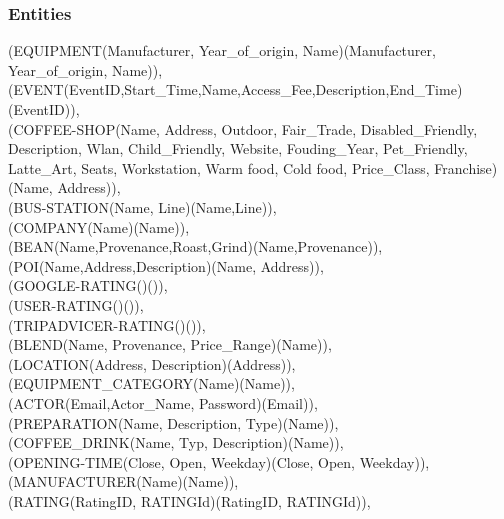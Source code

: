 { 
\subsubsection{Entities}
(EQUIPMENT(Manufacturer, Year\_of\_origin, Name)(Manufacturer, Year\_of\_origin, Name)),\\
(EVENT(EventID,Start\_Time,Name,Access\_Fee,Description,End\_Time)(EventID)),\\
(COFFEE-SHOP(Name, Address, Outdoor, Fair\_Trade, Disabled\_Friendly, Description, Wlan, Child\_Friendly, Website, Fouding\_Year, Pet\_Friendly, Latte\_Art, Seats, Workstation, Warm food, Cold food, Price\_Class, Franchise)(Name, Address)), \\
(BUS-STATION(Name, Line)(Name,Line)),\\
(COMPANY(Name)(Name)),\\
(BEAN(Name,Provenance,Roast,Grind)(Name,Provenance)),\\
(POI(Name,Address,Description)(Name, Address)), \\
(GOOGLE-RATING()()), \\
(USER-RATING()()), \\
(TRIPADVICER-RATING()()), \\
(BLEND(Name, Provenance, Price\_Range)(Name)), \\
(LOCATION(Address, Description)(Address)), \\
(EQUIPMENT\_CATEGORY(Name)(Name)), \\
(ACTOR(Email,Actor\_Name, Password)(Email)), \\
(PREPARATION(Name, Description, Type)(Name)), \\
(COFFEE\_DRINK(Name, Typ, Description)(Name)), \\
(OPENING-TIME(Close, Open, Weekday)(Close, Open, Weekday)), \\
(MANUFACTURER(Name)(Name)), \\
(RATING(RatingID, RATINGId)(RatingID, RATINGId)),  \\
}
